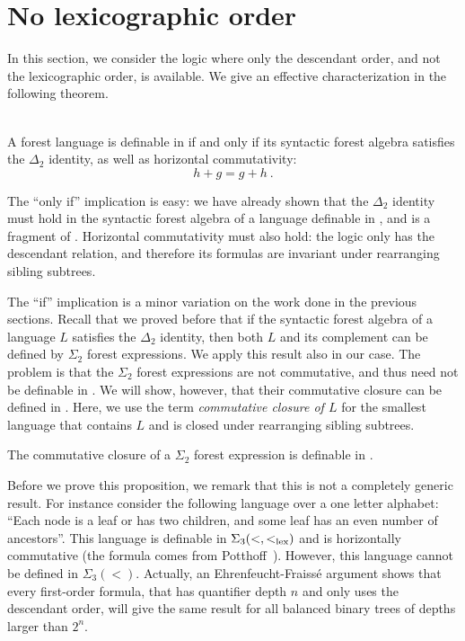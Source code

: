 \documentclass{LMCS}
\begin{document}
\section{No lexicographic order }\label{sec:nolex}
In this section, we consider the logic \Dtwo where only the descendant
order, and not the lexicographic order, is available. We give an
effective characterization in the following theorem.
\begin{thm}\label{thm:main-commutative}\ \\
 A forest language is definable in \Dtwo if and only if its syntactic
  forest algebra satisfies the $\Delta_2$ identity, as well as
  horizontal commutativity:
\begin{equation}
  \label{eq:horziontal-commutativity}
    h+g = g+h \ .
\end{equation}
\end{thm}





The ``only if'' implication is easy: we have already shown that the $\Delta_2$
identity must hold in the syntactic forest algebra of a language definable in
\Dtwol, and \Dtwo is a fragment of \Dtwol. Horizontal commutativity must
also hold: the logic only has the descendant relation, and therefore its
formulas are invariant under rearranging sibling subtrees.

The ``if'' implication is a minor variation on the work done in the
previous sections.  Recall that we proved before that if the syntactic
forest algebra of a language $L$ satisfies the $\Delta_2$ identity,
then both $L$ and its complement can be defined by $\Sigma_2$ forest
expressions. We apply this result also in our case. The problem is
that the $\Sigma_2$ forest expressions are not commutative, and thus
need not be definable in \Stwo.  We will show, however, that their
commutative closure can be defined in \Stwo. Here, we use the term
\emph{commutative closure of $L$} for the smallest language that
contains $L$ and is closed under rearranging sibling subtrees.


\begin{prop}
  The commutative closure of a $\Sigma_2$ forest expression is
  definable in \Stwo.
\end{prop}
Before we prove this proposition, we remark that this is not a
completely generic result. For instance consider the following language over a one letter alphabet: ``Each node is a
leaf or has two children, and some leaf has an even number of
ancestors''. This language is definable in $\Sigma_3(<,<_\mathrm{lex})$ and is horizontally
commutative (the formula comes from Potthoff~\cite{potthoff}). However, this language cannot be defined in $\Sigma_3(<)$. Actually,   an Ehrenfeucht-Fraiss\'e argument shows that every   first-order formula, that has  quantifier depth $n$  and only uses the
descendant order, will give the same result for all balanced binary trees of depths larger than $2^n$.
\end{document}

